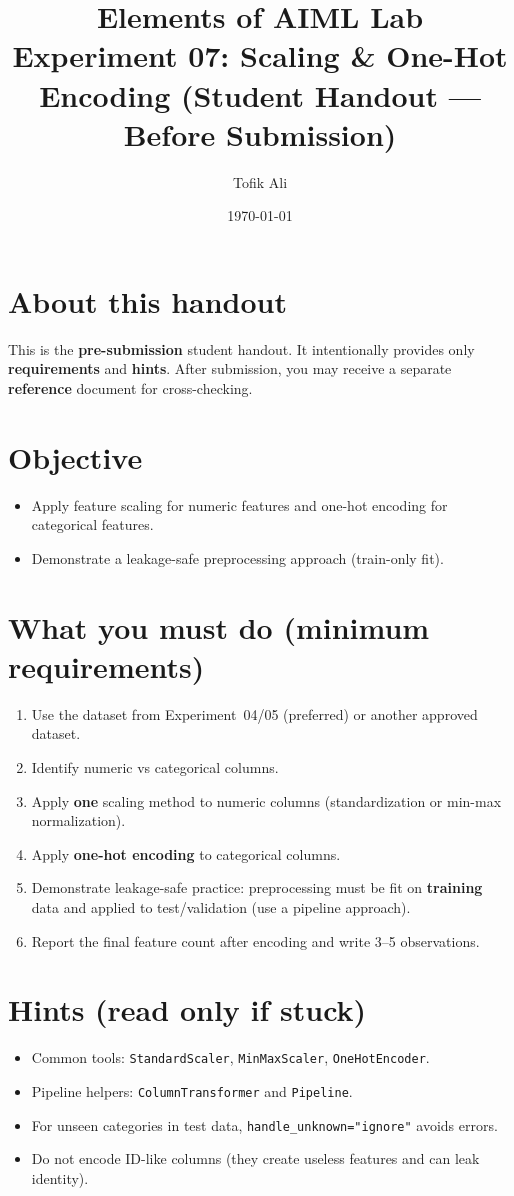\documentclass[11pt]{article}
\title{Elements of AIML Lab\\Experiment 07: Scaling \& One-Hot Encoding (Student Handout — Before Submission)}
\author{Tofik Ali}
\date{\today}
\begin{document}
\maketitle
\tableofcontents

\section{About this handout}
This is the \textbf{pre-submission} student handout.
It intentionally provides only \textbf{requirements} and \textbf{hints}.
After submission, you may receive a separate \textbf{reference} document for cross-checking.

\section{Objective}
\begin{itemize}[leftmargin=*]
  \item Apply feature scaling for numeric features and one-hot encoding for categorical features.
  \item Demonstrate a leakage-safe preprocessing approach (train-only fit).
\end{itemize}

\section{What you must do (minimum requirements)}
\begin{enumerate}[leftmargin=*]
  \item Use the dataset from Experiment~04/05 (preferred) or another approved dataset.
  \item Identify numeric vs categorical columns.
  \item Apply \textbf{one} scaling method to numeric columns (standardization or min-max normalization).
  \item Apply \textbf{one-hot encoding} to categorical columns.
  \item Demonstrate leakage-safe practice: preprocessing must be fit on \textbf{training} data and applied to test/validation (use a pipeline approach).
  \item Report the final feature count after encoding and write 3--5 observations.
\end{enumerate}

\section{Hints (read only if stuck)}
\begin{itemize}[leftmargin=*]
  \item Common tools: \texttt{StandardScaler}, \texttt{MinMaxScaler}, \texttt{OneHotEncoder}.
  \item Pipeline helpers: \texttt{ColumnTransformer} and \texttt{Pipeline}.
  \item For unseen categories in test data, \texttt{handle\_unknown="ignore"} avoids errors.
  \item Do not encode ID-like columns (they create useless features and can leak identity).
\end{itemize}
\end{document}
